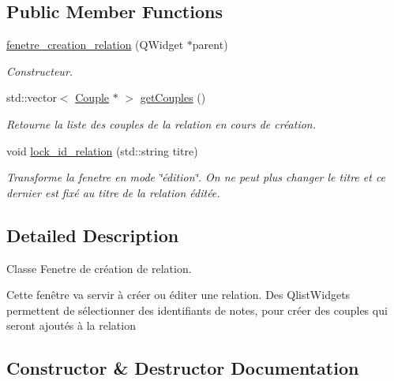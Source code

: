 \subsection*{Public Member Functions}
\begin{DoxyCompactItemize}
\item 
\hyperlink{classfenetre__creation__relation_ae7f98f1b23dbe45b922b61293348a07f}{fenetre\+\_\+creation\+\_\+relation} (Q\+Widget $\ast$parent)
\begin{DoxyCompactList}\small\item\em Constructeur. \end{DoxyCompactList}\item 
\mbox{\label{classfenetre__creation__relation_a843417e0a1f6350f8a3919eb92cf67dd}} 
std\+::vector$<$ \hyperlink{class_couple}{Couple} $\ast$ $>$ \hyperlink{classfenetre__creation__relation_a843417e0a1f6350f8a3919eb92cf67dd}{get\+Couples} ()
\begin{DoxyCompactList}\small\item\em Retourne la liste des couples de la relation en cours de création. \end{DoxyCompactList}\item 
void \hyperlink{classfenetre__creation__relation_a83c62031d4d8d973aca33e38d9079c49}{lock\+\_\+id\+\_\+relation} (std\+::string titre)
\begin{DoxyCompactList}\small\item\em Transforme la fenetre en mode \char`\"{}édition\char`\"{}. On ne peut plus changer le titre et ce dernier est fixé au titre de la relation éditée. \end{DoxyCompactList}\end{DoxyCompactItemize}


\subsection{Detailed Description}
Classe Fenetre de création de relation. 

Cette fenêtre va servir à créer ou éditer une relation. Des Qlist\+Widgets permettent de sélectionner des identifiants de notes, pour créer des couples qui seront ajoutés à la relation 

\subsection{Constructor \& Destructor Documentation}
\mbox{\label{classfenetre__creation__relation_ae7f98f1b23dbe45b922b61293348a07f}} 

